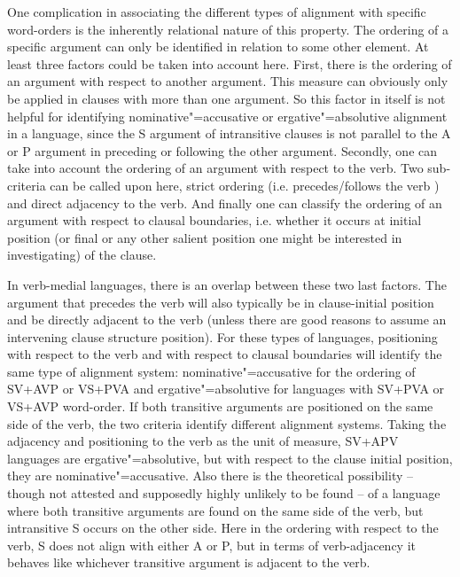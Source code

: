 One complication in associating the different types of alignment with specific word-orders is the inherently relational nature of this property.
The ordering of a specific argument can only be identified in relation to some other element.
At least three factors could be taken into account here.
First, there is the ordering of an argument with respect to another argument. 
This measure can obviously only be applied in clauses with more than one argument.
So this factor in itself is not helpful for identifying nominative"=accusative or ergative"=absolutive alignment in a language, since the S argument of intransitive clauses is not parallel to the A or P argument in preceding or following the other argument. %
Secondly, one can take into account the ordering of an argument with respect to the verb. %
Two sub-criteria can be called upon here, strict ordering (i.e. precedes/follows the verb%
) and direct adjacency to the verb. %
And finally one can classify the ordering of an argument with respect to clausal boundaries, %
i.e. whether it occurs at initial position (or final or any other salient position one might be interested in investigating) of the clause.

In verb-medial languages, there is an overlap between these two last factors. 
The argument that precedes the verb will also typically be in clause-initial position and be directly adjacent to the verb (unless there are good reasons to assume an intervening clause structure position). 
For these types of languages, positioning with respect to the verb and with respect to clausal boundaries will identify the same type of alignment system: nominative"=accusative for the ordering of SV+AVP or VS+PVA and ergative"=absolutive for languages with SV+PVA or VS+AVP word-order. 
If both transitive arguments are positioned on the same side of the verb, the two criteria identify different alignment systems. 
Taking the adjacency and positioning to the verb as the unit of measure, SV+APV languages are ergative"=absolutive, but with respect to the clause initial position, they are nominative"=accusative. 
Also there is the theoretical possibility -- though not attested and supposedly highly unlikely to be found -- of a language where both transitive arguments are found on the same side of the verb, but intransitive S occurs on the other side. 
Here in the ordering with respect to the verb, S does not align with either A or P, but in terms of verb-adjacency it behaves like whichever transitive argument is adjacent to the verb.


